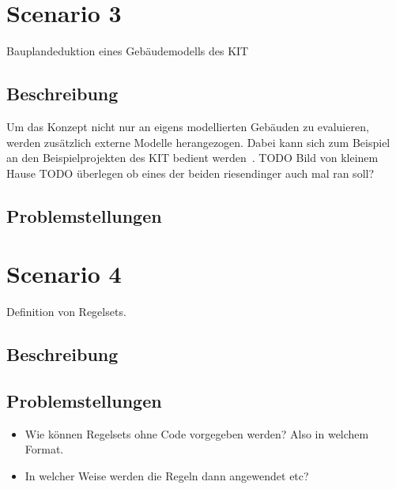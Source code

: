 \section{Scenario 3}\label{scenarios:scenario3}
Bauplandeduktion eines Gebäudemodells des KIT
\subsection*{Beschreibung}
Um das Konzept nicht nur an eigens modellierten Gebäuden zu evaluieren, werden zusätzlich externe Modelle herangezogen.
Dabei kann sich zum Beispiel an den Beispielprojekten des KIT bedient werden~\cite{KITSAMPLEHOUSE:online}.
TODO Bild von kleinem Hause
TODO überlegen ob eines der beiden riesendinger auch mal ran soll?
\subsection*{Problemstellungen}

\section{Scenario 4}\label{scenarios:scenario4}
Definition von Regelsets.
\subsection*{Beschreibung}
\subsection*{Problemstellungen}
\begin{itemize}
  \item Wie können Regelsets ohne Code vorgegeben werden? Also in welchem Format.
  \item In welcher Weise werden die Regeln dann angewendet etc?
\end{itemize}
